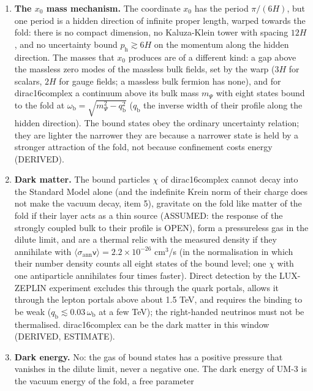 \documentclass[
  10pt,
]{article}
\providecommand{\tightlist}{%
  \setlength{\itemsep}{0pt}\setlength{\parskip}{0pt}}
\begin{document}
\begin{enumerate}
\def\labelenumi{\arabic{enumi}.}
\tightlist
\item
  \textbf{The \(x_0\) mass mechanism.} The coordinate \(x_0\) has the
  period \(\pi/(6H)\), but one period is a hidden direction of infinite
  proper length, warped towards the fold: there is no compact dimension,
  no Kaluza-Klein tower with spacing \(12H\), and no uncertainty bound
  \(p_{\mathrm{h}} \gtrsim 6H\) on the momentum along the hidden
  direction. The masses that \(x_0\) produces are of a different kind: a
  gap above the massless zero modes of the massless bulk fields, set by
  the warp (\(3H\) for scalars, \(2H\) for gauge fields; a massless bulk
  fermion has none), and for dirac16complex a continuum above its bulk
  mass \(m_\Psi\) with eight states bound to the fold at
  \(\omega_{\mathrm{b}} = \sqrt{m_\Psi^2 - q_{\mathrm{b}}^2}\)
  (\(q_{\mathrm{b}}\) the inverse width of their profile along the
  hidden direction). The bound states obey the ordinary uncertainty
  relation; they are lighter the narrower they are because a narrower
  state is held by a stronger attraction of the fold, not because
  confinement costs energy (DERIVED).
\item
  \textbf{Dark matter.} The bound particles \(\chi\) of dirac16complex
  cannot decay into the Standard Model alone (and the indefinite Krein
  norm of their charge does not make the vacuum decay, item 5),
  gravitate on the fold like matter of the fold if their layer acts as a
  thin source (ASSUMED: the response of the strongly coupled bulk to
  their profile is OPEN), form a pressureless gas in the dilute limit,
  and are a thermal relic with the measured density if they annihilate
  with
  \(\langle\sigma_{\mathrm{ann}}\mathsf{v}\rangle = 2.2\times10^{-26}\)
  cm\(^3\)/s (in the normalisation in which their number density counts
  all eight states of the bound level; one \(\chi\) with one
  antiparticle annihilates four times faster). Direct detection by the
  LUX-ZEPLIN experiment excludes this through the quark portals, allows
  it through the lepton portals above about 1.5 TeV, and requires the
  binding to be weak
  (\(q_{\mathrm{b}} \lesssim 0.03\,\omega_{\mathrm{b}}\) at a few TeV);
  the right-handed neutrinos must not be thermalised. dirac16complex can
  be the dark matter in this window (DERIVED, ESTIMATE).
\item
  \textbf{Dark energy.} No: the gas of bound states has a positive
  pressure that vanishes in the dilute limit, never a negative one. The
  dark energy of UM-3 is the vacuum energy of the fold, a free parameter

\end{enumerate}
\end{document}
